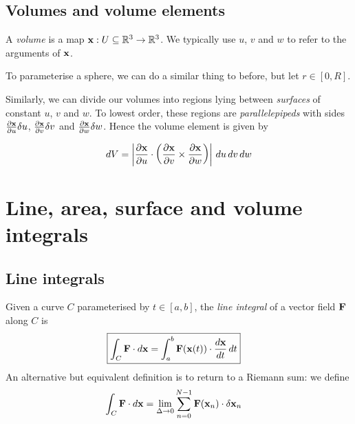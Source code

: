 \documentclass{../../template/note}
\begin{document}
    \subsection{Volumes and volume elements}

    \begin{definition*}
        A \emph{volume} is a map \(\V x: U \subseteq \RR^3 \to \RR^3\). We typically use \(u\), \(v\) and \(w\) to refer to the arguments of \(\V x\).
    \end{definition*}
    
    \begin{example*}
        To parameterise a sphere, we can do a similar thing to before, but let \(r \in [0, R]\).
    \end{example*}
    
    Similarly, we can divide our volumes into regions lying between \emph{surfaces} of constant \(u\), \(v\) and \(w\). To lowest order, these regions are \emph{parallelepipeds} with sides \(\pd{\V x}{u} \delta u\), \(\pd{\V x}{v} \delta v\) and \(\pd{\V x}{w} \delta w\). Hence the volume element is given by
    \begin{proposition}
        \label{4.5} \[
            dV = \left|\pd{\V x}{u} \cdot \left(\pd{\V x}{v} \times \pd{\V x}{w}\right)\right| \D u \D v \D w
        \]
    \end{proposition}
    
    \section{Line, area, surface and volume integrals}

    \subsection{Line integrals}

    \begin{definition*}
        Given a curve \(C\) parameterised by \(t \in [a, b]\), the \emph{line integral} of a vector field \(\V F\) along \(C\) is
        \begin{align*}
            \Aboxed{\int_C \V F \cdot d \V x = \int_a^b \V F(\V x(t)) \cdot \frac{d \V x}{dt} \D t}
        \end{align*}
        An alternative but equivalent definition is to return to a Riemann sum: we define
        \begin{align*}
            \int_C \V F \cdot d \V x &= \lim_{\Delta \to 0}\sum_{n=0}^{N-1} \V F(\V x_n) \cdot \delta \V x_n
        \end{align*}
    \end{definition*}
    
\end{document}

